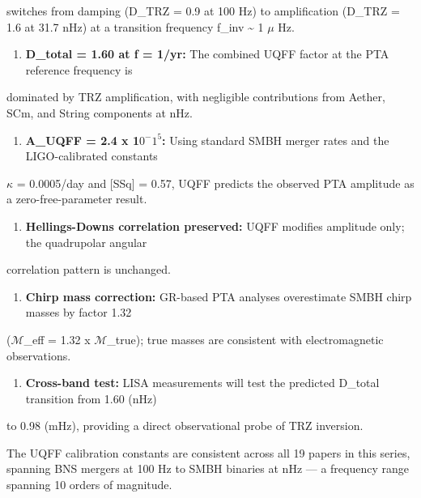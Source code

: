 \documentclass[12pt,a4paper]{article}
\begin{document}
switches from damping (D\_TRZ = 0.9 at 100 Hz) to amplification (D\_TRZ = 1.6 at 31.7 nHz) at a transition frequency f\_inv \textasciitilde{} 1 $\mu$ Hz.

\begin{enumerate}
  \item \textbf{D\_total = 1.60 at f = 1/yr:} The combined UQFF factor at the PTA reference frequency is
\end{enumerate}

dominated by TRZ amplification, with negligible contributions from Aether, SCm, and String components at nHz.

\begin{enumerate}
  \item \textbf{A\_UQFF = 2.4 x 1$0^{-}$$1^{5}$:} Using standard SMBH merger rates and the LIGO-calibrated constants
\end{enumerate}

$\kappa$ = 0.0005/day and [SSq] = 0.57, UQFF predicts the observed PTA amplitude as a zero-free-parameter result.

\begin{enumerate}
  \item \textbf{Hellings-Downs correlation preserved:} UQFF modifies amplitude only; the quadrupolar angular
\end{enumerate}

correlation pattern is unchanged.

\begin{enumerate}
  \item \textbf{Chirp mass correction:} GR-based PTA analyses overestimate SMBH chirp masses by factor 1.32
\end{enumerate}

($\mathcal{M}$\_eff = 1.32 x $\mathcal{M}$\_true); true masses are consistent with electromagnetic observations.

\begin{enumerate}
  \item \textbf{Cross-band test:} LISA measurements will test the predicted D\_total transition from 1.60 (nHz)
\end{enumerate}

to 0.98 (mHz), providing a direct observational probe of TRZ inversion.

The UQFF calibration constants are consistent across all 19 papers in this series, spanning BNS mergers at 100 Hz to SMBH binaries at nHz --- a frequency range spanning 10 orders of magnitude.
\end{document}
